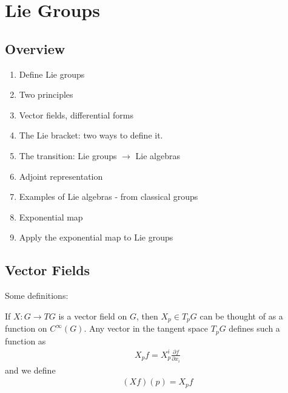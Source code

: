 \chapter{Lie Groups}
\label{cha:lie_groups}

\section{Overview}
\label{sec:overview}

\begin{enumerate}
    \makethislistcompact
    \item Define Lie groups
    \item Two principles
    \item Vector fields, differential forms
    \item The Lie bracket: two ways to define it.
    \item The transition: Lie groups $\to$  Lie algebras
    \item Adjoint representation
    \item Examples of Lie algebras - from classical groups
    \item Exponential map
    \item Apply the exponential map to Lie groups
\end{enumerate}



\section{Vector Fields}
\label{sec:vector_fields}

Some definitions:

If $X: G\to TG $ is a vector field on $G$, then $X_p \in T_p G$ can be thought of as a function on $C^\infty(G)$. Any vector in the tangent space $T_pG$ defines such a function as
\begin{align}
    X_p f = X^i_p \frac{\partial f} {\partial x_i}
\end{align}
and we define 
\begin{align}
    (Xf)(p) = X_p f
\end{align}




